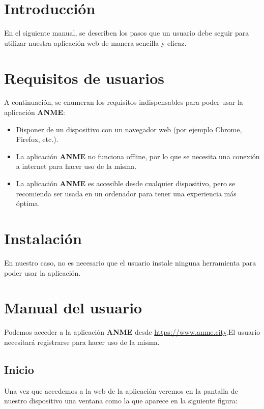 
\section{Introducción}
En el siguiente manual, se describen los pasos que un usuario debe seguir para utilizar nuestra aplicación web de manera sencilla y eficaz.

\section{Requisitos de usuarios}

A continuación, se enumeran los requisitos indispensables para poder usar la aplicación \textbf{ANME}:

\begin{itemize}
    \item Disponer de un dispositivo con un navegador web (por ejemplo Chrome, Firefox, etc.).
    \item La aplicación \textbf{ANME} no funciona offline, por lo que se necesita una conexión a internet para hacer uso de la misma.
    \item La aplicación \textbf{ANME} es accesible desde cualquier dispositivo, pero se recomienda ser usada en un ordenador para tener una experiencia más óptima.
\end{itemize}

\section{Instalación}

En nuestro caso, no es necesario que el usuario instale ninguna herramienta para poder usar la aplicación. 

\section{Manual del usuario}

Podemos acceder a la aplicación \textbf{ANME} desde \url{https://www.anme.city}.El usuario necesitará registrarse para hacer uso de la misma.

\subsection{Inicio}

Una vez que accedemos a la web de la aplicación veremos en la pantalla de nuestro dispositivo  una ventana como la que aparece en la siguiente figura:

